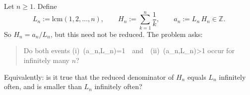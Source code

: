 Let $n\ge 1$.
Define
\[
L_n := \mathrm{lcm}(1,2,\dots,n),
\qquad
H_n := \sum_{k=1}^n \frac{1}{k},
\qquad
a_n := L_n\,H_n \in \mathbb{Z}.
\]
So $H_n=a_n/L_n$, but this need not be reduced.
The problem asks:
\begin{quote}
Do both events
\quad (i)\ \gcd(a_n,L_n)=1\ \ and\ \ (ii)\ \gcd(a_n,L_n)>1
occur for infinitely many $n$?
\end{quote}
Equivalently: is it true that the reduced denominator of $H_n$ equals $L_n$ infinitely often, and is smaller than $L_n$ infinitely often?
